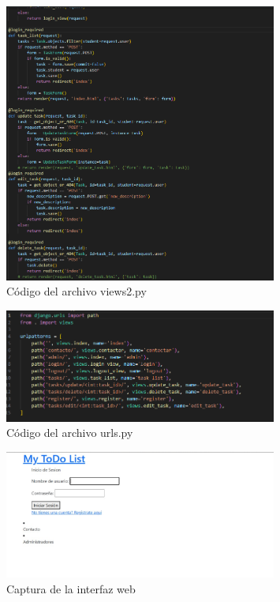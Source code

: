 \documentclass[12pt, a4paper]{article}
\begin{document}
\begin{figure}[ht]
	\centering
	\includegraphics[width=0.8\textwidth]{images/views2.png}
	\caption{Código del archivo views2.py}
	\label{fig:views2}
\end{figure}

\begin{figure}[ht]
	\centering
	\includegraphics[width=0.8\textwidth]{images/urls.png}
	\caption{Código del archivo urls.py}
	\label{fig:urls}
\end{figure}

\begin{figure}[ht]
	\centering
	\includegraphics[width=0.8\textwidth]{images/interface1.png}
	\caption{Captura de la interfaz web}
	\label{fig:interface1}
\end{figure}
\end{document}
